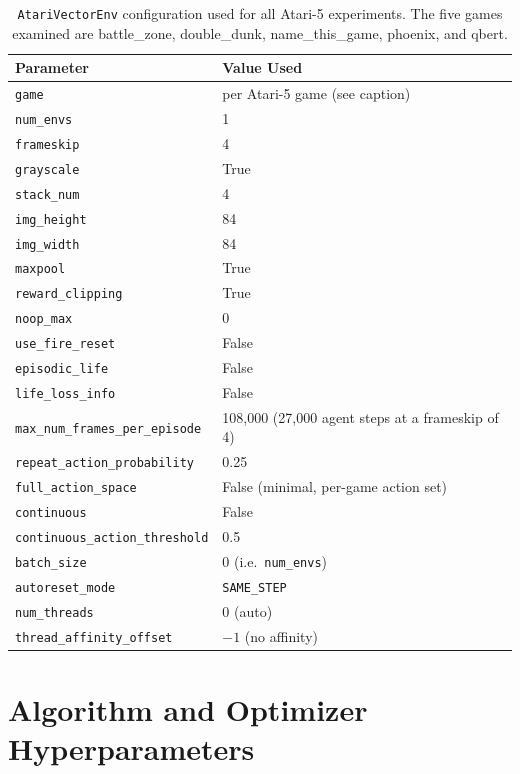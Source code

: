 \begin{table}[htbp]
\centering
\small
\setlength{\tabcolsep}{6pt}
\renewcommand{\arraystretch}{1.2}
\begin{tabular}{@{}l l@{}}
\toprule
Parameter & Value Used \\
\midrule
\texttt{game} & per Atari-5 game (see caption) \\
\texttt{num\_envs} & 1 \\
\texttt{frameskip} & 4 \\
\texttt{grayscale} & True \\
\texttt{stack\_num} & 4 \\
\texttt{img\_height} & 84 \\
\texttt{img\_width} & 84 \\
\texttt{maxpool} & True \\
\texttt{reward\_clipping} & True \\
\texttt{noop\_max} & 0 \\
\texttt{use\_fire\_reset} & False \\
\texttt{episodic\_life} & False \\
\texttt{life\_loss\_info} & False \\
\texttt{max\_num\_frames\_per\_episode} & 108{,}000 (27{,}000 agent steps at a frameskip of 4) \\
\texttt{repeat\_action\_probability} & 0.25 \\
\texttt{full\_action\_space} & False (minimal, per-game action set) \\
\texttt{continuous} & False \\
\texttt{continuous\_action\_threshold} & 0.5 \\
\texttt{batch\_size} & 0 (i.e.\ \texttt{num\_envs}) \\
\texttt{autoreset\_mode} & \texttt{SAME\_STEP} \\
\texttt{num\_threads} & 0 (auto) \\
\texttt{thread\_affinity\_offset} & $-1$ (no affinity) \\
\bottomrule
\end{tabular}
\caption[\texttt{AtariVectorEnv} configuration used for all Atari-5 experiments.]{\texttt{AtariVectorEnv} configuration used for all Atari-5 experiments. The five games examined are battle\_zone, double\_dunk, name\_this\_game, phoenix, and qbert.}
\label{tab:ale_params}
\end{table}

\chapter{Algorithm and Optimizer Hyperparameters}

